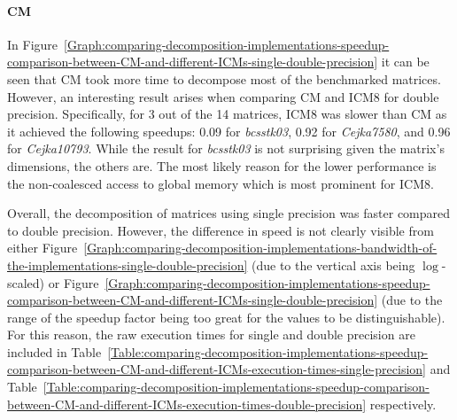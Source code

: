 \paragraph{CM}\label{Paragraph:comparing-decomposition-implementations-speedup-comparison-between-CM-and-different-ICMs-CM-speedup-description}
In Figure~\ref{Graph:comparing-decomposition-implementations-speedup-comparison-between-CM-and-different-ICMs-single-double-precision} it can be seen that CM took more time to decompose most of the benchmarked matrices. However, an interesting result arises when comparing CM and ICM8 for double precision. Specifically, for 3 out of the 14 matrices, ICM8 was slower than CM as it achieved the following speedups: 0.09 for \textit{bcsstk03}, 0.92 for \textit{Cejka7580}, and 0.96 for \textit{Cejka10793}. While the result for \textit{bcsstk03} is not surprising given the matrix's dimensions, the others are. The most likely reason for the lower performance is the non-coalesced access to global memory which is most prominent for ICM8.
\par Overall, the decomposition of matrices using single precision was faster compared to double precision. However, the difference in speed is not clearly visible from either Figure~\ref{Graph:comparing-decomposition-implementations-bandwidth-of-the-implementations-single-double-precision} (due to the vertical axis being $ \log $-scaled) or Figure~\ref{Graph:comparing-decomposition-implementations-speedup-comparison-between-CM-and-different-ICMs-single-double-precision} (due to the range of the speedup factor being too great for the values to be distinguishable). For this reason, the raw execution times for single and double precision are included in Table~\ref{Table:comparing-decomposition-implementations-speedup-comparison-between-CM-and-different-ICMs-execution-times-single-precision} and Table~\ref{Table:comparing-decomposition-implementations-speedup-comparison-between-CM-and-different-ICMs-execution-times-double-precision} respectively.


